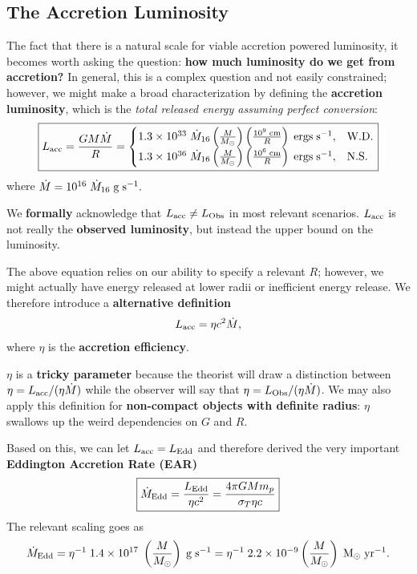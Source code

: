 \subsection{The Accretion Luminosity}
The fact that there is a natural scale for viable accretion powered luminosity, it becomes worth asking the question: \textbf{how much luminosity do we get from accretion?} In general, this is a complex question and not easily constrained; however, we might make a broad characterization by defining the \textbf{accretion luminosity}, which is the \textit{total released energy assuming perfect conversion}:
\begin{equation}
    \label{eq:accretion_luminosity}
    \boxed{
    L_{\rm acc} = \frac{GM\dot{M}}{R} = \begin{cases}
        1.3 \times 10^{33} \;\dot{M}_{16} \left(\frac{M}{M_\odot}\right) \left(\frac{10^9\;{\rm cm}}{R}\right)\;{\rm ergs\;s^{-1}},&\text{W.D.}\\
        1.3 \times 10^{36}  \;\dot{M}_{16} \left(\frac{M}{M_\odot}\right) \left(\frac{10^6\;{\rm cm}}{R}\right)\;{\rm ergs\;s^{-1}},&\text{N.S.}
    \end{cases}
    }
\end{equation}
where $\dot{M} = 10^{16}\;\dot{M}_{16} \;{\rm g\;s^{-1}}.$  
\begin{remark}
    We \textbf{formally} acknowledge that $L_{\rm acc} \neq L_{\rm Obs}$ in most relevant scenarios. $L_{\rm acc}$ is not really the \textbf{observed luminosity}, but instead the upper bound on the luminosity. 
\end{remark}
\par
The above equation relies on our ability to specify a relevant $R$; however, we might actually have energy released at lower radii or inefficient energy release. We therefore introduce a \textbf{alternative definition}
\begin{equation}
    L_{\rm acc} = \eta c^2 \dot{M},
\end{equation}
where $\eta$ is the \textbf{accretion efficiency}. 
\begin{remark}
    $\eta$ is a \textbf{tricky parameter} because the theorist will draw a distinction between $\eta = L_{\rm acc}/(\eta \dot{M})$ while the observer will say that $\eta = L_{\rm Obs}/(\eta \dot{M})$. We may also apply this definition for \textbf{non-compact objects with definite radius}: $\eta$ swallows up the weird dependencies on $G$ and $R$.
\end{remark}
Based on this, we can let $L_{\rm acc} = L_{\rm Edd}$ and therefore derived the very important \textbf{Eddington Accretion Rate (EAR)}
\begin{equation}
\boxed{
    \dot{M}_{\rm Edd} = \frac{L_{\rm Edd}}{\eta c^2} = \frac{4\pi G M m_p}{\sigma_T \eta c}}
\end{equation}
The relevant scaling goes as
\[
 \dot{M}_{\rm Edd} = \eta^{-1}\; 1.4 \times 10^{17}\; \left(\frac{M}{M_\odot}\right)\;{\rm g\; s^{-1}} = \eta^{-1}\;2.2 \times 10^{-9} \left(\frac{M}{M_\odot}\right)\; {\rm M_\odot\;yr^{-1}}.
\]


